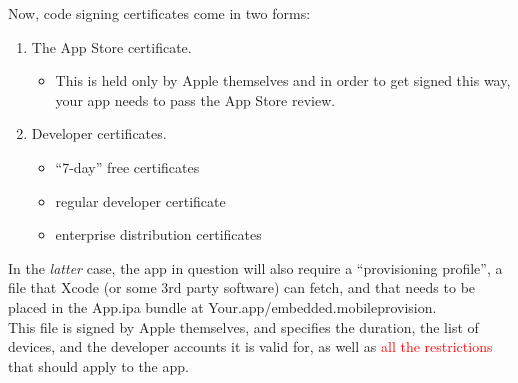 \documentclass{beamer}
\begin{document}
\begin{frame}[fragile]
\begin{flushleft}
Now, code signing certificates come in two forms:\vfill
\begin{enumerate}
  \item The App Store certificate.
  \begin{itemize}
      \item This is held only by Apple themselves and in order to get signed this way, your app needs to pass the App Store review.
  \end{itemize}
  \item Developer certificates.
  \begin{itemize}
      \item “7-day” free certificates
      \item regular developer certificate
      \item enterprise distribution certificates
  \end{itemize}
\end{enumerate}
\vfill
{\footnotesize In the \emph{latter} case, the app in question will also require a “provisioning profile”, a file that Xcode (or some 3rd party software) can fetch, and that needs to be placed in the App.ipa bundle at Your.app/embedded.mobileprovision.}\\\vspace{4mm}
This file is signed by Apple themselves, and specifies the duration, the list of devices, and the developer accounts it is valid for, as well as \textcolor{red}{all the restrictions} that should apply to the app.
\end{flushleft}
\end{frame}
\end{document}
